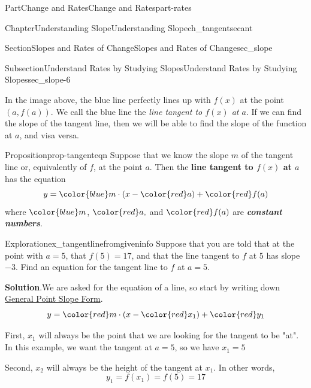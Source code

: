 \documentclass{tufte-book}
\newcommand{\blocktitlefont}{\relax}
\newcommand{\alert}[1]{\textbf{\textit{#1}}}
\newcommand{\terminology}[1]{\textbf{#1}}
\numberwithin{equation}{chapter}
\begin{document}
\begin{partptx}{Part}{Change and Rates}{}{Change and Rates}{}{}{part-rates}
\begin{chapterptx}{Chapter}{Understanding Slope}{}{Understanding Slope}{}{}{ch_tangentsecant}
\begin{sectionptx}{Section}{Slopes and Rates of Change}{}{Slopes and Rates of Change}{}{}{sec_slope}
\begin{subsectionptx}{Subsection}{Understand Rates by Studying Slopes}{}{Understand Rates by Studying Slopes}{}{}{sec_slope-6}
\begin{image}{0.125}{0.75}{0.125}{}
{
}%
\end{image}%
In the image above, the blue line perfectly lines up with \(f(x)\) at the point \((a,f(a))\). We call the blue line the \emph{line tangent to \(f(x)\) at \(a\)}. If we can find the slope of the tangent line, then we will be able to find the slope of the function at \(a\), and visa versa.%
\begin{proposition}{Proposition}{}{}{prop-tangenteqn}%
Suppose that we know the slope \(m\) of the tangent line or, equivalently of \(f\), at the point \(a\). Then the \terminology{line tangent to \(f(x)\) at \(a\)} has the equation%
\begin{equation*}
y = {\color{blue} m}\cdot (x - {\color{red} a}) + {\color{red} f(a)}
\end{equation*}
where \({\color{blue} m}\), \({\color{red} a},\) and \({\color{red} f(a)}\) are \alert{constant numbers}.%
\end{proposition}
\begin{exploration}{Exploration}{}{ex_tangentlinefromgiveninfo}%
Suppose that you are told that at the point with \(a=5\), that \(f(5) = 17\), and that the line tangent to \(f\) at \(5\)  has slope \(-3\).  Find an equation for the tangent line to \(f\) at \(a=5\).%
\par\smallskip%
\noindent\textbf{\blocktitlefont Solution}.\hypertarget{ex_tangentlinefromgiveninfo-2}{}\quad{}We are asked for the equation of a line, so start by writing down \hyperref[def-point_slope]{General Point Slope Form}.%
\begin{equation*}
y = {\color{red} m} \cdot (x - {\color{red} x_1}) + {\color{red} y_1}
\end{equation*}
%
\par
First, \(x_1\) will always be the point that we are looking for the tangent to be "at".  In this example, we want the tangent at \(a=5\), so we have \(x_1=5\)%
\par
Second, \(x_2\) will always be the height of the tangent at \(x_1\).  In other words,%
\begin{equation*}
y_1 = f(x_1) = f(5) = 17
\end{equation*}

\end{exploration}
\end{subsectionptx}
\end{sectionptx}
\end{chapterptx}
\end{partptx}
\end{document}
